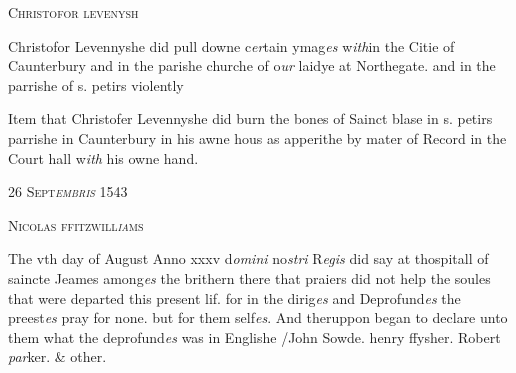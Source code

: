 \documentclass[12pt, a4paper]{book}
\begin{document}
               
               	
				\begin{center}  {\scshape Christofor levenysh}  \end{center}
			
 
               	
               		
			
               		
		\ifthenelse{\isodd{\thepage}}
		{\reversemarginpar}
		{\normalmarginpar}
		Christofor Levennyshe did pull downe
               			c\textit{er}tain ymag\textit{es} w\textit{ith}in the Citie of Caunterbury
  and in the parishe churche of o\textit{ur} laidye at
 Northegate. and in the parrishe of s. petirs
 violently
               	
               	
               		
			
               		
		\ifthenelse{\isodd{\thepage}}
		{\reversemarginpar}
		{\normalmarginpar}
		Item that Christofer Levennyshe did burn
 the bones of Sainct blase in s. petirs parrishe
 	in Caunterbury in his awne hous as apperithe
 by mater of Record in the Court hall w\textit{ith} his
 owne hand.
 

            
            
               
				\begin{center} \begin{large} {\scshape 
                  26 Sept\textit{embris} 1543
               } \end{large} \end{center}
			
               
               	
				\begin{center}  {\scshape Nicolas ffitzwill\textit{ia}ms}  \end{center}
			
               	
               		
			
               		
		\ifthenelse{\isodd{\thepage}}
		{\reversemarginpar}
		{\normalmarginpar}
		The vth day of August Anno xxxv d\textit{omini} no\textit{stri }R\textit{egis} did say
 at thospitall of saincte Jeames among\textit{es} the brithern
  there that praiers did not help the soules that
 were departed this present lif. for in the dirig\textit{es}
 and Deprofund\textit{es} the preest\textit{es} pray for none.
 but for them self\textit{es}. And theruppon began
 to declare unto them what the deprofund\textit{es} was
               			in Englishe /John Sowde. henry ffysher.
               			Robert \textit{par}ker. \& other.
               	
\end{document}

